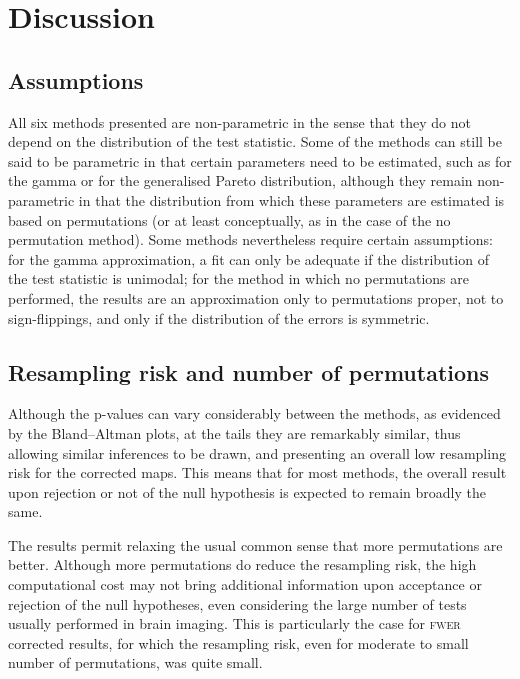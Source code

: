 \section{Discussion}

\subsection{Assumptions}

All six methods presented are non-parametric in the sense that they do not depend on the distribution of the test statistic. Some of the methods can still be said to be parametric in that certain parameters need to be estimated, such as for the gamma or for the generalised Pareto distribution, although they remain non-parametric in that the distribution from which these parameters are estimated is based on permutations (or at least conceptually, as in the case of the no permutation method). Some methods nevertheless require certain assumptions: for the gamma approximation, a fit can only be adequate if the distribution of the test statistic is unimodal; for the method in which no permutations are performed, the results are an approximation only to permutations proper, not to sign-flippings, and only if the distribution of the errors is symmetric.

\subsection{Resampling risk and number of permutations}

Although the p-values can vary considerably between the methods, as evidenced by the Bland--Altman plots, at the tails they are remarkably similar, thus allowing similar inferences to be drawn, and presenting an overall low resampling risk for the corrected maps. This means that for most methods, the overall result upon rejection or not of the null hypothesis is expected to remain broadly the same.

The results permit relaxing the usual common sense that more permutations are better. Although more permutations do reduce the resampling risk, the high computational cost may not bring additional information upon acceptance or rejection of the null hypotheses, even considering the large number of tests usually performed in brain imaging. This is particularly the case for \textsc{fwer} corrected results, for which the resampling risk, even for moderate to small number of permutations, was quite small.

